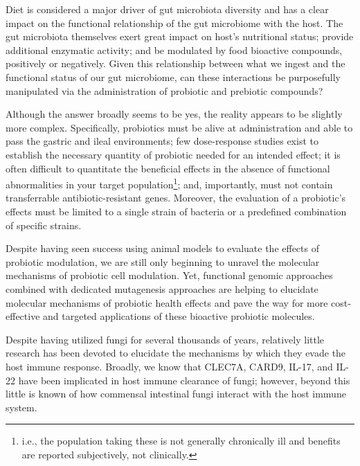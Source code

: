 \documentclass[11pt,letterpaper,final] {article}
\begin{document}

\doublespacing


Diet is considered a major driver of gut microbiota diversity and has a clear impact on the functional relationship of the gut microbiome with the host. The gut microbiota themselves exert great impact on host's nutritional status; provide additional enzymatic activity; and be modulated by food bioactive compounds, positively or negatively. Given this relationship between what we ingest and the functional status of our gut microbiome, can these interactions be purposefully manipulated via the administration of probiotic and prebiotic compounds?

Although the answer broadly seems to be yes, the reality appears to be slightly more complex. Specifically, probiotics must be alive at administration and able to pass the gastric and ileal environments; few dose-response studies exist to establish the necessary quantity of probiotic needed for an intended effect; it is often difficult to quantitate the beneficial effects in the absence of functional abnormalities in your target population\footnote{i.e., the population taking these is not generally chronically ill and benefits are reported subjectively, not clinically.}; and, importantly, must not contain transferrable antibiotic-resistant genes. Moreover, the evaluation of a probiotic's effects must be limited to a single strain of bacteria or a predefined combination of specific strains.

Despite having seen success using animal models to evaluate the effects of probiotic modulation, we are still only beginning to unravel the molecular mechanisms of probiotic cell modulation. Yet, functional genomic approaches combined with dedicated mutagenesis approaches are helping to elucidate molecular mechanisms of probiotic health effects and pave the way for more cost‐effective and targeted applications of these bioactive probiotic molecules.

\clearpage


Despite having utilized fungi for several thousands of years, relatively little research has been devoted to elucidate the mechanisms by which they evade the host immune response. Broadly, we know that CLEC7A, CARD9, IL-17, and IL-22 have been implicated in host immune clearance of fungi; however, beyond this little is known of how commensal intestinal fungi interact with the host immune system.
\end{document}
